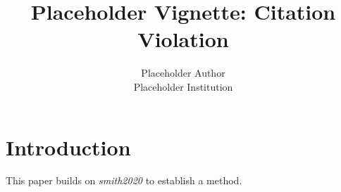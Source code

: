\documentclass{jss}
\author{Placeholder Author\\Placeholder Institution}
\title{Placeholder Vignette: Citation Violation}
\begin{document}
\section{Introduction}

This paper builds on \emph{smith2020} to establish a method.
\end{document}
